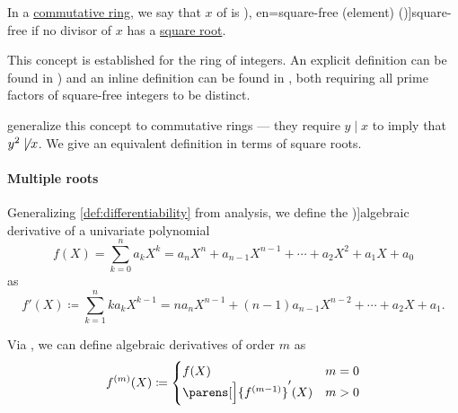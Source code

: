 \begin{definition}\label{def:square_free_element}\mimprovised
   In a \hyperref[def:ring/commutative]{commutative ring}, we say that \( x \) of is \term[ru=свободное от квадратов (число) (\cite[def. 93]{Бухштаб1966ТеорияЧисел}), en=square-free (element) (\cite[79]{JędrzejewiczEtAl2017SquareFreeFactorization})]{square-free} if no  divisor of \( x \) has a \hyperref[def:nth_root]{square root}.
\end{definition}
\begin{comments}
  \item This concept is established for the ring of integers. An explicit definition can be found in \cite[def. 93]{Бухштаб1966ТеорияЧисел}) and an inline definition can be found in \cite[176]{Birkhoff1967LatticeTheory}, both requiring all prime factors of square-free integers to be distinct.

   generalize this concept to commutative rings --- they require \( y \mid x \) to imply that \( y^2 \not\mid x \). We give an equivalent definition in terms of square roots.
\end{comments}

\paragraph{Multiple roots}

\begin{definition}\label{def:algebraic_derivative}
  Generalizing \cref{def:differentiability} from analysis, we define the \term[ru=производная (\cite[163]{Тыртышников2017ОсновыАлгебры})]{algebraic derivative} of a univariate polynomial
  \begin{equation*}
    f(X) = \sum_{k=0}^n a_k X^k = a_n X^n + a_{n-1} X^{n-1} + \cdots + a_2 X^2 + a_1 X + a_0
  \end{equation*}
  as
  \begin{equation*}
    f'(X) \coloneqq \sum_{k=1}^n k a_k X^{k-1} = n a_n X^{n-1} + (n-1) a_{n-1} X^{n-2} + \cdots + a_2 X + a_1.
  \end{equation*}

  Via , we can define algebraic derivatives of order \( m \) as
  \begin{equation*}
    f^{(m)}(X) \coloneqq \begin{cases}
      f(X)                             &m = 0 \\
      \parens[\Big]{ f^{(m - 1)} }'(X) &m > 0
    \end{cases}
  \end{equation*}
\end{definition}

